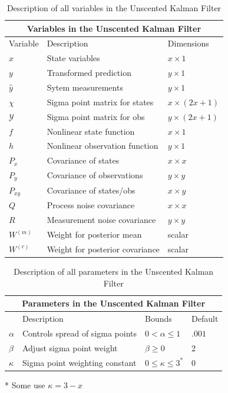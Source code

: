 \begin{enumerate}
\begin{center}
\begin{table}
\centering
\caption{Description of all variables in the Unscented Kalman Filter} \label{tab:sometab}
\begin{tabular}{ |p{2cm}||p{5cm}|p{2cm}| }
    \hline
    \multicolumn{3}{|c|}{Variables in the Unscented Kalman Filter } \\ 
    \hline
    Variable & Description & Dimensions \\
    \hline
    $x$ & State variables & $ x \times 1 $\\ 
    $y$ & Transformed prediction & $y \times 1 $\\ 
    $\hat y$ & Sytem measurements & $y \times 1 $\\ 
    $\chi $ & Sigma point matrix for states&$ x \times (2x + 1) $\\
    $\mathcal{Y}$ & Sigma point matrix for obs &$ y \times (2x + 1) $\\
    $f$ & Nonlinear state function & $x \times 1 $  \\ 
    $h$ & Nonlinear observation function & $y \times 1$\\
    $P_x$ & Covariance of states & $x \times x $  \\
    $P_y$ & Covariance of observations& $y \times y $  \\
    $P_{xy}$ & Covariance of states/obs& $x \times y $  \\
    $Q$ & Process noise covariance & $x \times x $  \\
    $R$ & Measurement noise covariance & $y \times y $  \\
    $W^{(m)}$ & Weight for posterior mean & scalar \\
    $W^{(c)}$ & Weight for posterior covariance & scalar \\
    \hline
\end{tabular} 

\end{table}
\end{center}

\begin{center}
\begin{table}
\centering
\caption{Description of all parameters in the Unscented Kalman Filter} \label{tab:sometab}
\begin{tabular}{ |p{1cm}||p{5cm}|p{2cm}| p{1cm}| }
    \hline
    \multicolumn{4}{|c|}{Parameters in the Unscented Kalman Filter } \\ 
    \hline
     & Description & Bounds & Default \\
    \hline
    $\alpha$ & Controls spread of sigma points & $0 < \alpha \leq 1$ & $.001$\\
    $\beta$ & Adjust sigma point weight & $\beta \geq 0$ & 2\\
    $\kappa $ & Sigma point weighting constant & $0 \leq \kappa \leq 3^{*}$  & 0 \\
    \hline
\end{tabular}
\end{table}
\end{center}
* Some use $\kappa  = 3 - x$             
            

\end{enumerate}
